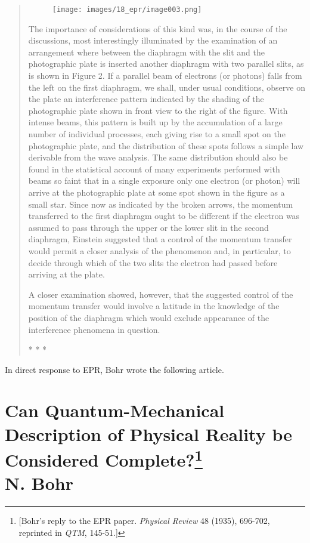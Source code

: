 \documentclass[11pt]{memoir}
\begin{document}
\begin{quote}
%
\begin{figure}[h] %
  \begin{center}
    \texttt{[image: images/18\_epr/image003.png]}
  \end{center}
\end{figure}
%


The importance of considerations of this kind was, in the course of the
discussions, most interestingly illuminated by the examination of an
arrangement where between the diaphragm with the slit and the
photographic plate is inserted another diaphragm with two parallel
slits, as is shown in Figure 2. If a parallel beam of electrons (or
photons) falls from the left on the first diaphragm, we shall, under
usual conditions, observe on the plate an interference pattern indicated
by the shading of the photographic plate shown in front view to the
right of the figure. With intense beams, this pattern is built up by the
accumulation of a large number of individual processes, each giving rise
to a small spot on the photographic plate, and the distribution of these
spots follows a simple law derivable from the wave analysis. The same
distribution should also be found in the statistical account of many
experiments performed with beams so faint that in a single exposure only
one electron (or photon) will arrive at the photographic plate at some
spot shown in the figure as a small star. Since now as indicated by the
broken arrows, the momentum transferred to the first diaphragm ought to
be different if the electron was assumed to pass through the upper or
the lower slit in the second diaphragm, Einstein suggested that a
control of the momentum transfer would permit a closer analysis of the
phenomenon and, in particular, to decide through which of the two slits
the electron had passed before arriving at the plate.

A closer examination showed, however, that the suggested control of the
momentum transfer would involve a latitude in the knowledge of the
position of the diaphragm which would exclude appearance of the
interference phenomena in question.\\
\centerline{* * *}
%
\end{quote}

In direct response to EPR, Bohr wrote the following article.


\section*{Can Quantum-Mechanical Description of Physical Reality be Considered
Complete?\footnote{[Bohr's reply to the EPR paper. \emph{Physical
  Review} 48 (1935), 696-702, reprinted in \emph{QTM}, 145-51.]}\\
  {\large N. Bohr}}
\end{document}
